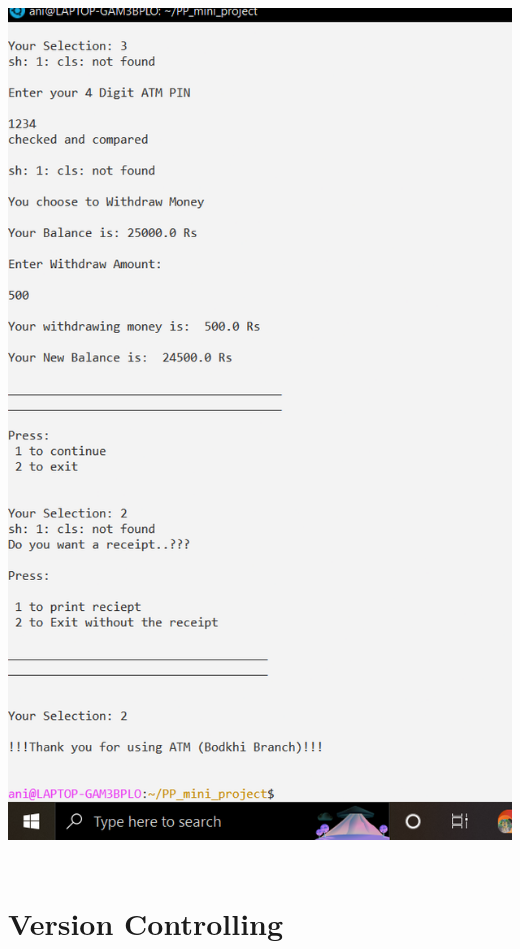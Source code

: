 \documentclass{article}
\begin{document}
\includegraphics[scale=0.35]{output_py_3.png}  \\ \\

\section{Version Controlling}
    
 
\end{document}
